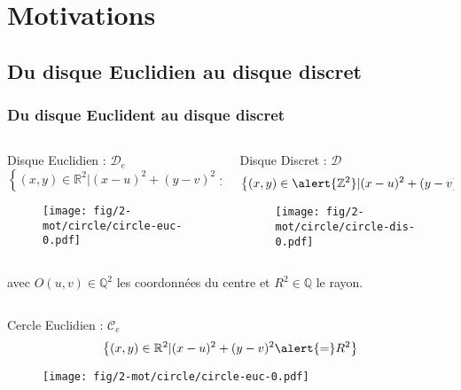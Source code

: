 \section{Motivations}

\subsection{Du disque Euclidien au disque discret}


\begin{frame}
\frametitle{Du disque Euclident au disque discret}
{
  \begin{columns}[t]
    \begin{column}{0.5\linewidth}
      \begin{block}{Disque Euclidien : $\mathcal{D}_e$}
        $$\left\{ (x,y) \in \mathbb{R}^{2} | (x - u)^2 + (y - v)^2 \leq R^2 \right\}$$
        \begin{figure}[h!]
          \centering
          \texttt{[image: fig/2-mot/circle/circle-euc-0.pdf]}
        \end{figure}
      \end{block}
    
    \end{column}
    \begin{column}{0.5\linewidth}
      \begin{block}{Disque Discret : $\mathcal{D}$}
        $$\left\{ (x,y) \in \alert{\mathbb{Z}^{2}} | (x - u)^2 + (y - v)^2 \leq R^2 \right\}$$

        \begin{figure}[h!]
          \centering
          \texttt{[image: fig/2-mot/circle/circle-dis-0.pdf]}
        \end{figure}
      \end{block}  
    \end{column}
  \end{columns} 

  \begin{exampleblock}{}
  avec $O(u,v) \in \mathbb{Q}^{2}$ les coordonnées du centre et $R^2 \in \mathbb{Q}$ le rayon.\\
  \end{exampleblock}
}
        
{
  \begin{columns}[t]
    \begin{column}{0.5\linewidth}
      \begin{block}{Cercle Euclidien : $\mathcal{C}_e$}
        $$\left\{ (x,y) \in \mathbb{R}^{2} | (x - u)^2 + (y - v)^2 \alert{=} R^2 \right\}$$
        \begin{figure}[h!]
          \centering
          \texttt{[image: fig/2-mot/circle/circle-euc-0.pdf]}
        \end{figure}
      \end{block}
    

\end{column}
\end{columns}}
\end{frame}
